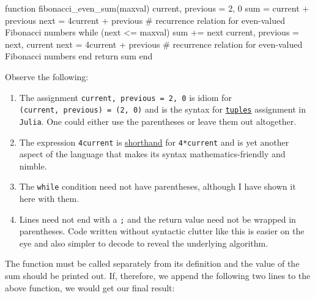 \documentclass[
  a4paper,
]{article}
\newenvironment{Shaded}{\begin{snugshade}}{\end{snugshade}}
\newcommand{\CommentTok}[1]{\textcolor[rgb]{0.50,0.62,0.50}{#1}}
\newcommand{\ControlFlowTok}[1]{\textcolor[rgb]{0.94,0.87,0.69}{#1}}
\newcommand{\FloatTok}[1]{\textcolor[rgb]{0.75,0.75,0.82}{#1}}
\newcommand{\FunctionTok}[1]{\textcolor[rgb]{0.94,0.94,0.56}{#1}}
\newcommand{\KeywordTok}[1]{\textcolor[rgb]{0.94,0.87,0.69}{#1}}
\newcommand{\NormalTok}[1]{\textcolor[rgb]{0.80,0.80,0.80}{#1}}
\newcommand{\OperatorTok}[1]{\textcolor[rgb]{0.94,0.94,0.82}{#1}}
\begin{document}
\begin{Shaded}
\begin{Highlighting}[]
\KeywordTok{function} \FunctionTok{fibonacci\_even\_sum}\NormalTok{(maxval)}
\NormalTok{  current, previous }\OperatorTok{=} \FloatTok{2}\NormalTok{, }\FloatTok{0}
\NormalTok{  sum }\OperatorTok{=}\NormalTok{ current }\OperatorTok{+}\NormalTok{ previous}
\NormalTok{  next }\OperatorTok{=} \FloatTok{4}\NormalTok{current }\OperatorTok{+}\NormalTok{ previous }\CommentTok{\# recurrence relation for even{-}valued Fibonacci numbers}
  \ControlFlowTok{while}\NormalTok{ (next }\OperatorTok{\textless{}=}\NormalTok{ maxval)}
\NormalTok{    sum }\OperatorTok{+=}\NormalTok{ next}
\NormalTok{    current, previous }\OperatorTok{=}\NormalTok{ next, current}
\NormalTok{    next }\OperatorTok{=} \FloatTok{4}\NormalTok{current }\OperatorTok{+}\NormalTok{ previous }\CommentTok{\# recurrence relation for even{-}valued Fibonacci numbers}
  \ControlFlowTok{end}
  \ControlFlowTok{return}\NormalTok{ sum}
\KeywordTok{end}
\end{Highlighting}
\end{Shaded}

Observe the following:

\begin{enumerate}
\item
  The assignment \texttt{current,\ previous\ =\ 2,\ 0} is idiom for
  \texttt{(current,\ previous)\ =\ (2,\ 0)} and is the syntax for
  \href{https://discourse.julialang.org/t/correct-way-to-do-multiple-variable-assignments/30242}{\texttt{tuples}}
  assignment in \texttt{Julia}. One could either use the parentheses or
  leave them out altogether.
\item
  The expression \texttt{4current} is
  \href{https://docs.julialang.org/en/v1/manual/integers-and-floating-point-numbers/\#man-numeric-literal-coefficients}{shorthand}
  for \texttt{4*current} and is yet another aspect of the language that
  makes its syntax mathematics-friendly and nimble.
\item
  The \texttt{while} condition need not have parentheses, although I
  have shown it here with them.
\item
  Lines need not end with a \texttt{;} and the return value need not be
  wrapped in parentheses. Code written without syntactic clutter like
  this is easier on the eye and also simpler to decode to reveal the
  underlying algorithm.
\end{enumerate}

The function must be called separately from its definition and the value
of the sum should be printed out. If, therefore, we append the following
two lines to the above function, we would get our final result:
\end{document}

